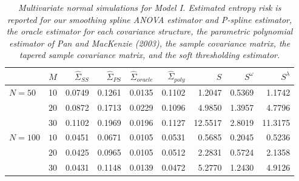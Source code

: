 \bigskip
\setlength{\dashlinedash}{0.5pt}
\setlength{\dashlinegap}{1pt}
\setlength{\arrayrulewidth}{0.2pt}
%
\begin{table}[H]
\centering
\caption{\textit{Multivariate normal simulations for Model I. Estimated entropy risk is reported for our smoothing spline ANOVA estimator and P-spline estimator, the oracle estimator for each covariance structure, the parametric polynomial estimator of Pan and MacKenzie (2003), the sample covariance matrix, the tapered sample covariance matrix, and the soft thresholding estimator.}}
\begin{tabular}{lrrrrrrrr}
 & $M$ &$\hat{\Sigma}_{SS}$& $\hat{\Sigma}_{PS}$ &$\hat{\Sigma}_{oracle}$& $\hat{\Sigma}_{poly}$ & $S$ &$S^\omega$& $S^\lambda$ \\ 
  \hline
$N = 50$ & 10 & 0.0749 & 0.1261 & 0.0135 & 0.1102 & 1.2047 & 0.5369 & 1.1742 \\ 
   & $20$ & 0.0872 & 0.1713 & 0.0229 & 0.1096 & 4.9850 & 1.3957 & 4.7796 \\ 
   & $30$ & 0.1102 & 0.1969 & 0.0196 & 0.1127 & 12.5517 & 2.8019 & 11.3175 \\ 
 $N = 100$ & $10$ & 0.0451 & 0.0671 & 0.0105 & 0.0531 & 0.5685 & 0.2045 & 0.5236 \\ 
   & $20$ & 0.0425 & 0.0965 & 0.0105 & 0.0512 & 2.2831 & 0.5724 & 2.1358 \\ 
   & $30$ & 0.0431 & 0.1148 & 0.0139 & 0.0472 & 5.2770 & 1.2430 & 4.9126 \\ 
   \hline
\end{tabular}
\label{table:simulation-1-entropy-loss-sigma-1}
\end{table}



